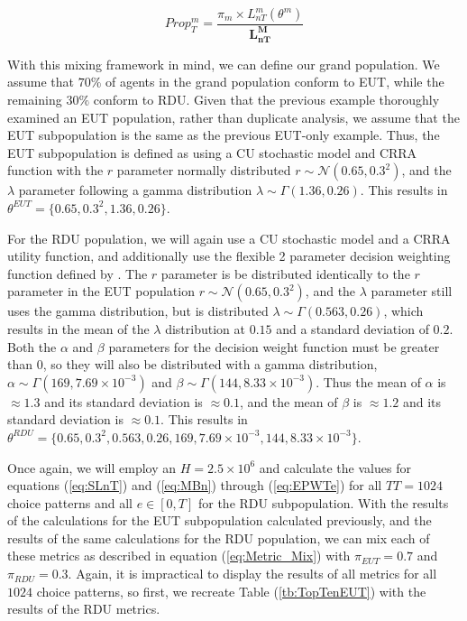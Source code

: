 \documentclass[../main.tex]{subfiles}
\begin{document}
\begin{equation}
	\label{eq:Propm}
	\mathit{Prop^m_{T}} = \frac{\pi_m \times L_{nT}^m(\theta^m) }{\bm{L_{nT}^M}}
\end{equation}

With this mixing framework in mind, we can define our grand population.
We assume that $70\%$ of agents in the grand population conform to EUT, while the remaining $30\%$ conform to RDU.
Given that the previous example thoroughly examined an EUT population, rather than duplicate analysis, we assume that the EUT subpopulation is the same as the previous EUT-only example.
Thus, the EUT subpopulation is defined as using a CU stochastic model and CRRA function with the $r$ parameter normally distributed $r \sim \mathcal{N}(0.65 , 0.3^2 )$, and the $\lambda$ parameter following a gamma distribution $\lambda \sim \Gamma(1.36 , 0.26)$.
This results in $\theta^{EUT} = \lbrace 0.65 ,0.3^2, 1.36 , 0.26\rbrace$.

For the RDU population, we will again use a CU stochastic model and a CRRA utility function, and additionally use the flexible 2 parameter decision weighting function defined by \textcite{Prelec1998}.
The $r$ parameter is be distributed identically to the $r$ parameter in the EUT population $r \sim \mathcal{N}(0.65 , 0.3^2 )$, and the $\lambda$ parameter still uses the gamma distribution, but is distributed $\lambda \sim \Gamma(0.563 , 0.26)$, which results in the mean of the $\lambda$ distribution at $0.15$ and a standard deviation of $0.2$.{\footnotemark}
Both the $\alpha$ and $\beta$ parameters for the decision weight function must be greater than $0$, so they will also be distributed with a gamma distribution, $\alpha \sim \Gamma(169 , 7.69 \times 10^{-3})$ and $\beta \sim \Gamma(144 , 8.33 \times 10^{-3})$.
Thus the mean of $\alpha$ is $\approx 1.3$ and its standard deviation is $\approx 0.1$, and the mean of $\beta$ is $\approx 1.2$ and its standard deviation is $\approx 0.1$.
This results in $\theta^{RDU} = \lbrace  0.65 ,0.3^2,  0.563 , 0.26 , 169 , 7.69 \times 10^{-3} , 144 , 8.33 \times 10^{-3} \rbrace$.

\addtocounter{footnote}{-1}

Once again, we will employ an $H = 2.5 \times 10^6$ and calculate the values for equations (\ref{eq:SLnT}) and (\ref{eq:MBn}) through (\ref{eq:EPWTe}) for all $\mathit{TT} =1024$ choice patterns and all $e \in[0,T]$ for the RDU subpopulation.
With the results of the calculations for the EUT subpopulation calculated previously, and the results of the same calculations for the RDU population, we can mix each of these metrics as described in equation (\ref{eq:Metric_Mix}) with $\pi_{EUT} = 0.7$ and $\pi_{RDU} = 0.3$.
Again, it is impractical to display the results of all metrics for all $1024$ choice patterns, so first, we recreate Table (\ref{tb:TopTenEUT}) with the results of the RDU metrics.
\end{document}
